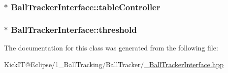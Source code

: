 \subsubsection[{\texorpdfstring{table\+Controller}{tableController}}]{$\ast$ Ball\+Tracker\+Interface\+::table\+Controller\hspace{0.3cm}{\ttfamily [protected]}}\hypertarget{class_ball_tracker_interface_a1716b6f0ad84d9d68da4dec0955450bf}{}\label{class_ball_tracker_interface_a1716b6f0ad84d9d68da4dec0955450bf}
\subsubsection[{\texorpdfstring{threshold}{threshold}}]{$\ast$ Ball\+Tracker\+Interface\+::threshold\hspace{0.3cm}{\ttfamily [protected]}}\hypertarget{class_ball_tracker_interface_ae6c6c4c3d89a8cc65bceec6c56af3b62}{}\label{class_ball_tracker_interface_ae6c6c4c3d89a8cc65bceec6c56af3b62}


The documentation for this class was generated from the following file\+:\begin{DoxyCompactItemize}
\item 
Kick\+I\+T@\+Eclipse/1\+\_\+\+Ball\+Tracking/\+Ball\+Tracker/\hyperlink{___ball_tracker_interface_8hpp}{\+\_\+\+Ball\+Tracker\+Interface.\+hpp}\end{DoxyCompactItemize}
